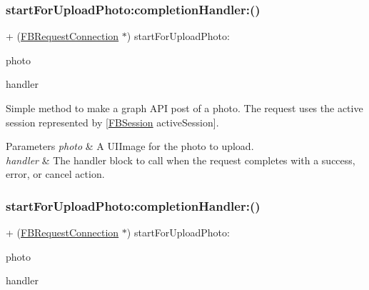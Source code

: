 \subsubsection{\texorpdfstring{start\+For\+Upload\+Photo\+:completion\+Handler\+:()}{startForUploadPhoto:completionHandler:()}\hspace{0.1cm}{\footnotesize\ttfamily [1/5]}}
{\footnotesize\ttfamily + (\hyperlink{interfaceFBRequestConnection}{F\+B\+Request\+Connection} $\ast$) start\+For\+Upload\+Photo\+: \begin{DoxyParamCaption}\item[{(U\+I\+Image $\ast$)}]{photo }\item[{completionHandler:(F\+B\+Request\+Handler)}]{handler }\end{DoxyParamCaption}}

Simple method to make a graph A\+PI post of a photo. The request uses the active session represented by {\ttfamily \mbox{[}\hyperlink{interfaceFBSession}{F\+B\+Session} active\+Session\mbox{]}}.


\begin{DoxyParams}{Parameters}
{\em photo} & A {\ttfamily U\+I\+Image} for the photo to upload. \\
\hline
{\em handler} & The handler block to call when the request completes with a success, error, or cancel action. \\
\hline
\end{DoxyParams}
\mbox{\label{interfaceFBRequestConnection_a824e16e083537312be6d59c8bece3f0e}} 
\subsubsection{\texorpdfstring{start\+For\+Upload\+Photo\+:completion\+Handler\+:()}{startForUploadPhoto:completionHandler:()}\hspace{0.1cm}{\footnotesize\ttfamily [2/5]}}
{\footnotesize\ttfamily + (\hyperlink{interfaceFBRequestConnection}{F\+B\+Request\+Connection} $\ast$) start\+For\+Upload\+Photo\+: \begin{DoxyParamCaption}\item[{(U\+I\+Image $\ast$)}]{photo }\item[{completionHandler:(F\+B\+Request\+Handler)}]{handler }\end{DoxyParamCaption}}

